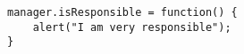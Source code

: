 \begin{verbatim}
manager.isResponsible = function() {
    alert("I am very responsible");
}
\end{verbatim}
